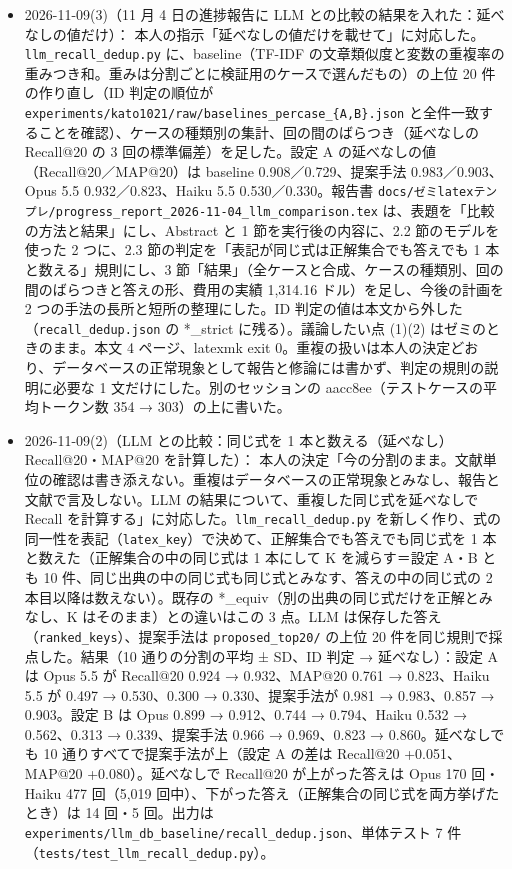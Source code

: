 \documentclass[11pt,a4paper]{jsarticle}
\begin{document}
\begin{itemize}[nosep]
  \item 2026-11-09(3)（11 月 4 日の進捗報告に LLM との比較の結果を入れた：延べなしの値だけ）：
    本人の指示「延べなしの値だけを載せて」に対応した。\texttt{llm\_recall\_dedup.py} に、baseline（TF-IDF の文章類似度と変数の重複率の重みつき和。重みは分割ごとに検証用のケースで選んだもの）の上位 20 件の作り直し（ID 判定の順位が \texttt{experiments/kato1021/raw/baselines\_percase\_\{A,B\}.json} と全件一致することを確認）、ケースの種類別の集計、回の間のばらつき（延べなしの Recall@20 の 3 回の標準偏差）を足した。設定 A の延べなしの値（Recall@20／MAP@20）は baseline 0.908／0.729、提案手法 0.983／0.903、Opus 5.5 0.932／0.823、Haiku 5.5 0.530／0.330。報告書 \texttt{docs/ゼミlatexテンプレ/progress\_report\_2026-11-04\_llm\_comparison.tex} は、表題を「比較の方法と結果」にし、Abstract と 1 節を実行後の内容に、2.2 節のモデルを使った 2 つに、2.3 節の判定を「表記が同じ式は正解集合でも答えでも 1 本と数える」規則にし、3 節「結果」（全ケースと合成、ケースの種類別、回の間のばらつきと答えの形、費用の実績 1,314.16 ドル）を足し、今後の計画を 2 つの手法の長所と短所の整理にした。ID 判定の値は本文から外した（\texttt{recall\_dedup.json} の *\_strict に残る）。議論したい点 (1)(2) はゼミのときのまま。本文 4 ページ、latexmk exit 0。重複の扱いは本人の決定どおり、データベースの正常現象として報告と修論には書かず、判定の規則の説明に必要な 1 文だけにした。別のセッションの aacc8ee（テストケースの平均トークン数 354 → 303）の上に書いた。
  \item 2026-11-09(2)（LLM との比較：同じ式を 1 本と数える（延べなし）Recall@20・MAP@20 を計算した）：
    本人の決定「今の分割のまま。文献単位の確認は書き添えない。重複はデータベースの正常現象とみなし、報告と文献で言及しない。LLM の結果について、重複した同じ式を延べなしで Recall を計算する」に対応した。\texttt{llm\_recall\_dedup.py} を新しく作り、式の同一性を表記（\texttt{latex\_key}）で決めて、正解集合でも答えでも同じ式を 1 本と数えた（正解集合の中の同じ式は 1 本にして K を減らす＝設定 A・B とも 10 件、同じ出典の中の同じ式も同じ式とみなす、答えの中の同じ式の 2 本目以降は数えない）。既存の *\_equiv（別の出典の同じ式だけを正解とみなし、K はそのまま）との違いはこの 3 点。LLM は保存した答え（\texttt{ranked\_keys}）、提案手法は \texttt{proposed\_top20/} の上位 20 件を同じ規則で採点した。結果（10 通りの分割の平均 ± SD、ID 判定 → 延べなし）：設定 A は Opus 5.5 が Recall@20 0.924 → 0.932、MAP@20 0.761 → 0.823、Haiku 5.5 が 0.497 → 0.530、0.300 → 0.330、提案手法が 0.981 → 0.983、0.857 → 0.903。設定 B は Opus 0.899 → 0.912、0.744 → 0.794、Haiku 0.532 → 0.562、0.313 → 0.339、提案手法 0.966 → 0.969、0.823 → 0.860。延べなしでも 10 通りすべてで提案手法が上（設定 A の差は Recall@20 +0.051、MAP@20 +0.080）。延べなしで Recall@20 が上がった答えは Opus 170 回・Haiku 477 回（5,019 回中）、下がった答え（正解集合の同じ式を両方挙げたとき）は 14 回・5 回。出力は \texttt{experiments/llm\_db\_baseline/recall\_dedup.json}、単体テスト 7 件（\texttt{tests/test\_llm\_recall\_dedup.py}）。

\end{itemize}
\end{document}
